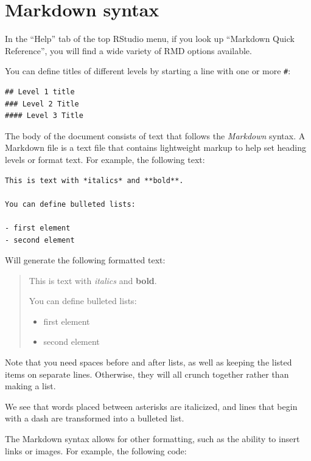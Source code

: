 \documentclass[
  letterpaper,
  DIV=11,
  numbers=noendperiod]{scrreprt}
\providecommand{\tightlist}{%
  \setlength{\itemsep}{0pt}\setlength{\parskip}{0pt}}\usepackage{longtable,booktabs,array}
\begin{document}
\hypertarget{markdown-syntax}{%
\section{Markdown syntax}\label{markdown-syntax}}

In the ``Help'' tab of the top RStudio menu, if you look up ``Markdown
Quick Reference'', you will find a wide variety of RMD options
available.

You can define titles of different levels by starting a line with one or
more \texttt{\#}:

\begin{verbatim}
## Level 1 title
### Level 2 Title
#### Level 3 Title
\end{verbatim}

The body of the document consists of text that follows the
\emph{Markdown} syntax. A Markdown file is a text file that contains
lightweight markup to help set heading levels or format text. For
example, the following text:

\begin{verbatim}
This is text with *italics* and **bold**.

You can define bulleted lists:

- first element
- second element
\end{verbatim}

Will generate the following formatted text:

\begin{quote}
This is text with \emph{italics} and \textbf{bold}.

You can define bulleted lists:

\begin{itemize}
\tightlist
\item
  first element
\item
  second element
\end{itemize}
\end{quote}

Note that you need spaces before and after lists, as well as keeping the
listed items on separate lines. Otherwise, they will all crunch together
rather than making a list.

We see that words placed between asterisks are italicized, and lines
that begin with a dash are transformed into a bulleted list.

The Markdown syntax allows for other formatting, such as the ability to
insert links or images. For example, the following code:
\end{document}
